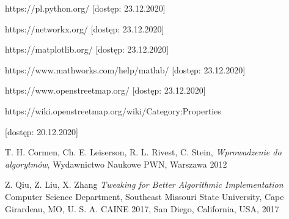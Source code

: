 \documentclass[a4paper, 12pt, twoside, openright]{article}
\begin{document}
\begin{thebibliography}{99}
	
	
	

	
	 https://pl.python.org/ [dostęp: 23.12.2020]
	
	 https://networkx.org/ [dostęp: 23.12.2020]
	
	 https://matplotlib.org/ [dostęp: 23.12.2020]

	 https://www.mathworks.com/help/matlab/ [dostęp: 23.12.2020]
	
	 https://www.openstreetmap.org/ [dostęp: 23.12.2020]
	
	
	 https://wiki.openstreetmap.org/wiki/Category:Properties
	
		
	[dostęp: 20.12.2020]

	T. H. Cormen, Ch. E. Leiserson, R. L. Rivest, C. Stein, \textit{Wprowadzenie do algorytmów}, Wydawnictwo Naukowe PWN, Warszawa 2012
	
	Z. Qiu, Z. Liu, X. Zhang \textit{Tweaking for Better Algorithmic Implementation}	Computer Science Department, Southeast Missouri State University, Cape Girardeau, MO, U. S. A. CAINE 2017, San Diego, California, USA, 2017
	
\end{thebibliography}	
\end{document}
